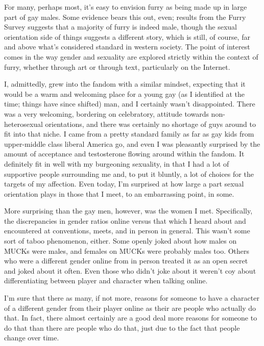 
For many, perhaps most, it's easy to envision furry as being made up in large part of gay males.  Some evidence bears this out, even; results from the Furry Survey suggests that a majority of furry is indeed male, though the sexual orientation side of things suggests a different story, which is still, of course, far and above what's considered standard in western society.  The point of interest comes in the way gender and sexuality are explored strictly within the context of furry, whether through art or through text, particularly on the Internet.

I, admittedly, grew into the fandom with a similar mindset, expecting that it would be a warm and welcoming place for a young gay (as I identified at the time; things have since shifted) man, and I certainly wasn't disappointed.  There was a very welcoming, bordering on celebratory, attitude towards non-heterosexual orientations, and there was certainly no shortage of guys around to fit into that niche.  I came from a pretty standard family as far as gay kids from upper-middle class liberal America go, and even I was pleasantly surprised by the amount of acceptance and testosterone flowing around within the fandom.  It definitely fit in well with my burgeoning sexuality, in that I had a lot of supportive people surrounding me and, to put it bluntly, a lot of choices for the targets of my affection.  Even today, I'm surprised at how large a part sexual orientation plays in those that I meet, to an embarrassing point, in some.

More surprising than the gay men, however, was the women I met.  Specifically, the discrepancies in gender ratios online versus that which I heard about and encountered at conventions, meets, and in person in general.  This wasn't some sort of taboo phenomenon, either.  Some openly joked about how males on MUCKs were males, and females on MUCKs were probably males too.  Others who were a different gender online from in person treated it as an open secret and joked about it often.  Even those who didn't joke about it weren't coy about differentiating between player and character when talking online.

I'm sure that there as many, if not more, reasons for someone to have a character of a different gender from their player online as their are people who actually do that.  In fact, there almost certainly are a good deal more reasons for someone to do that than there are people who do that, just due to the fact that people change over time.

